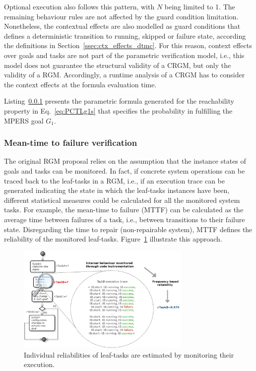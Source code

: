 Optional execution also follows this pattern, with $N$ being limited to 1. The remaining behaviour rules are not affected by the guard condition limitation. Nonetheless, the contextual effects are also modelled as guard conditions that defines a deterministic transition to running, skipped or failure state, according the definitions in Section~\ref{ssec:ctx_effects_dtmc}. For this reason, context effects over goals and tasks are not part of the parametric verification model, i.e., this model does not guarantee the structural validity of a CRGM, but only the validity of a RGM. Accordingly, a runtime analysis of a CRGM has to consider the context effects at the formula evaluation time.

Listing~\ref{} presents the parametric formula generated for the reachability property in Eq.~\eqref{eq:PCTLg1s} that specifies the probability in fulfilling the MPERS goal $G_{1}$. 


\subsubsection{Mean-time to failure verification}

The original RGM proposal relies on the assumption that the instance states of goals and tasks can be monitored. In fact, if concrete system operations can be traced back to the leaf-tasks in a RGM, i.e., if an execution trace can be generated indicating the state in which the leaf-tasks instances have been, different statistical measures could be calculated for all the monitored system tasks. For example, the mean-time to failure (MTTF) can be calculated as the average time between failures of a task, i.e., between transitions to their failure state. Disregarding the time to repair (non-repairable system), MTTF defines the reliability of the monitored leaf-tasks. Figure~\ref{fig:MON_PMC} illustrate this approach.




\begin{figure}[ht!]
\centering
\includegraphics[width=0.75\textwidth]{imgs/MON_PMC.png}
\caption{Individual reliabilities of leaf-tasks are estimated by monitoring their execution.}
\label{fig:MON_PMC}
\end{figure}

